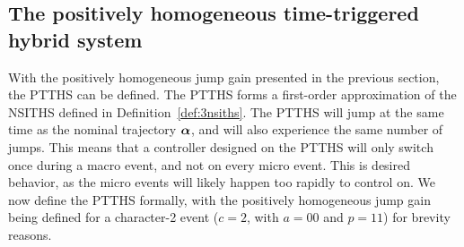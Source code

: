 \documentclass[../DC2017114Bouma.tex]{subfiles}
\begin{document}

\subsection{The positively homogeneous time-triggered hybrid system}\label{def:4PTTHS}
With the positively homogeneous jump gain presented in the previous section, the PTTHS can be defined. The PTTHS forms a first-order approximation of the NSITHS defined in Definition~\ref{def:3nsiths}. The PTTHS will jump at the same time as the nominal trajectory $\boldsymbol{\alpha}$, and will also experience the same number of jumps. This means that a controller designed on the PTTHS will only switch once during a macro event, and not on every micro event. This is desired behavior, as the micro events will likely happen too rapidly to control on. We now define the PTTHS formally, with the positively homogeneous jump gain being defined for a character-2 event ($c = 2$, with $a = 00$ and $p=11$) for brevity reasons.
\end{document}
